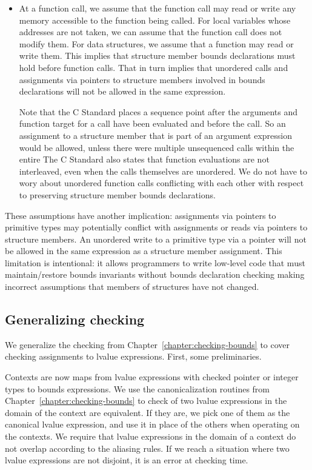\begin{itemize}
\item At a function call, we assume that the function call may read or write any memory accessible
to the function being called.  For local variables whose addresses are not taken, we can assume that 
the function call does not modify them. For data structures, we assume that a function may read or 
write them.  This implies that structure member bounds declarations must hold before function calls.
That in turn implies that unordered calls and assignments via pointers to structure members involved
in bounds declarations will not be allowed in the same expression.

Note that the C Standard places a sequence point after the arguments and function target for a call have been 
evaluated and before the call.  So an assignment to a structure member that is part of an argument 
expression would be allowed, unless there were multiple unsequenced calls within the entire 
The C Standard also states that
function evaluations are not interleaved, even when the calls themselves are unordered.  We do
not have to wory about unordered function calls conflicting with each other with respect to preserving
structure member bounds declarations.
\end{itemize}

These assumptions have another implication: assignments via pointers to primitive types may potentially
conflict with assignments or reads via pointers to structure members.  An unordered
write to a primitive type via a pointer will not be allowed in the same expression as a 
structure member assignment.  This limitation is intentional: it allows programmers to write
low-level code that must maintain/restore bounds invariants without bounds declaration
checking making incorrect assumptions that members of structures have not changed.

\subsection{Generalizing checking}

We generalize the checking from Chapter~\ref{chapter:checking-bounds} to cover checking
assignments to lvalue expressions.  First, some preliminaries.

Contexts are now maps from lvalue expressions with checked pointer or integer types
to bounds expressions.  We use the canonicalization routines from Chapter~\ref{chapter:checking-bounds}
to check of two lvalue expressions in the domain of the context are equivalent.  If
they are, we pick one of them as the canonical lvalue expression, and use it in place
of the others when operating on the contexts.  We require that lvalue expressions
in the domain of a context do not overlap according to the aliasing rules. If we
reach a situation where two lvalue expressions are not disjoint, it is an error
at checking time.


